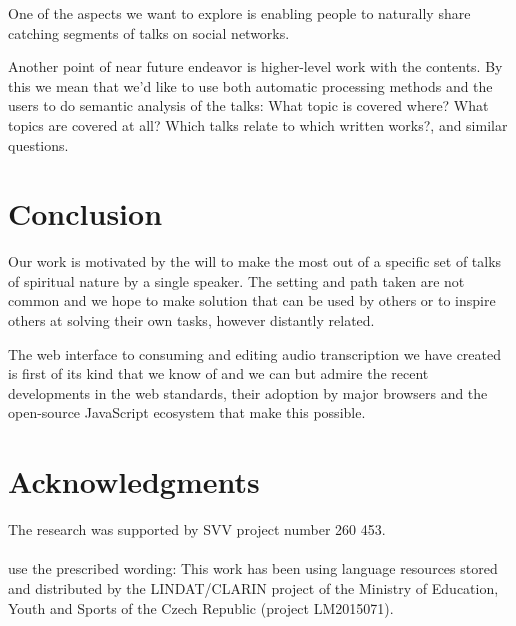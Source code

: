 \documentclass{svproc}
\begin{document}
One of the aspects we want to explore is enabling people to naturally share
catching segments of talks on social networks.

Another point of near future endeavor is higher-level work with the contents. By
this we mean that we'd like to use both automatic processing methods and the
users to do semantic analysis of the talks: What topic is covered where? What
topics are covered at all? Which talks relate to which written works?, and
similar questions.

\section{Conclusion}

Our work is motivated by the will to make the most out of a specific set of
talks of spiritual nature by a single speaker. The setting and path taken are
not common and we hope to make solution that can be used by others or to inspire
others at solving their own tasks, however distantly related.

The web interface to consuming and editing audio transcription we have created
is first of its kind that we know of and we can but admire the recent
developments in the web standards, their adoption by major browsers and the
open-source JavaScript ecosystem that make this possible.

\section*{Acknowledgments}

The research was supported by SVV project number 260 453.\\
\\
use the prescribed wording: This work has been using language resources stored
and distributed  by the LINDAT/CLARIN project of the Ministry of Education,
Youth and Sports of the Czech Republic (project LM2015071).
\end{document}
